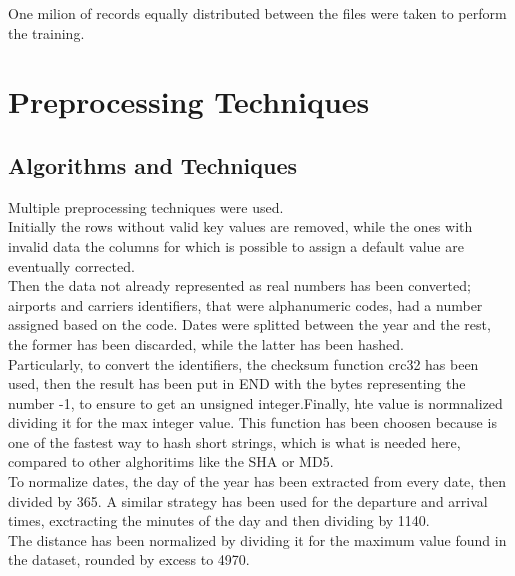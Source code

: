 \documentclass[
	letterpaper, %
	10pt, %
]{class}
\begin{document}
One milion of records equally distributed between the files were taken to perform the training.


\section{Preprocessing Techniques}

\subsection{Algorithms and Techniques}

Multiple preprocessing techniques were used.\\

Initially the rows without valid key values are removed, while the ones with invalid data the columns for which is possible to assign a default value are eventually corrected.\\

Then the data not already represented as real numbers has been converted; airports and carriers identifiers, that were alphanumeric codes, had a number assigned based on the code. Dates were splitted between the year and the rest, the former has been discarded, while the latter has been hashed.\\

Particularly, to convert the identifiers, the checksum function crc32 has been used, then the result has been put in END with the bytes representing the number -1, to ensure to get an unsigned integer.Finally, hte value is normnalized dividing it for the max integer value.
This function has been choosen because is one of the fastest way to hash short strings, which is what is needed here, compared to other alghoritims like the SHA or MD5.\\

To normalize dates, the day of the year has been extracted from every date, then divided by 365. A similar strategy has been used for the departure and arrival times, exctracting the minutes of the day and then dividing by 1140.\\

The distance has been normalized by dividing it for the maximum value found in the dataset, rounded by excess to 4970.\\
\end{document}
